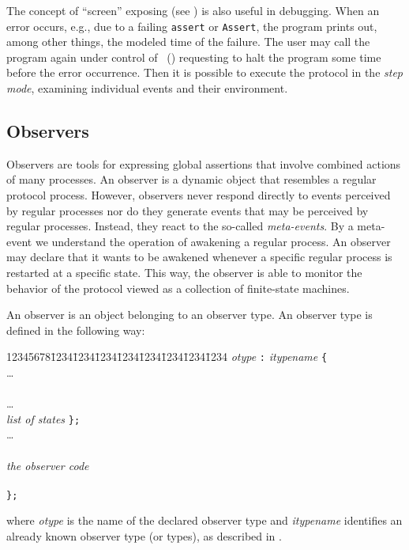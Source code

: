 The concept of ``screen'' exposing (see )
is also useful in debugging.
When an error occurs, e.g.,
due to a failing {\tt assert} or {\tt Assert}, the program prints out,
among other things, the modeled time of the failure.
The user may call the program again under control of \dsd\
() requesting to halt the program some time before
the error occurrence.
Then it is possible to execute the protocol in the {\em step mode},
examining individual events and their environment.

\subsection{Observers}
\label{rm_ob_ob}

Observers are tools for expressing global assertions that involve combined
actions of many processes.
An observer is a dynamic object that resembles a regular protocol process.
However,
observers never respond directly to events perceived by regular processes
nor do they generate events that may be perceived by regular processes.
Instead, they react to the so-called {\em meta-events}.
By a meta-event we understand the operation of awakening a regular process.
An observer may declare that it wants to be awakened whenever a specific
regular process is restarted at a specific state.
This way, the observer is able to monitor the behavior of the protocol viewed
as a collection of finite-state machines.

An observer is an object belonging to an observer type.
An observer type is defined in the following way:
{\tt\begin{tabbing}
12345678\=1234\=1234\=1234\=1234\=1234\=1234\=1234\=1234\kill
{} {\em otype\/} {\tt :} {\em itypename\/} {\tt \{} \\
\> \>\ldots \\
\>  \\
\> \>\ldots \\
\>  {\em list of states\/} {\tt \};} \\
\> \>\ldots \\
\>  \\
\> \> \> {\em the observer code} \\
\> \>{\tt \};} \\
\> {\tt \};}
\end{tabbing}}
where {\em otype\/} is the name of the declared observer type and
{\em itypename\/} identifies an already known observer type (or types),
as described in \sect{rm_st_td}.

